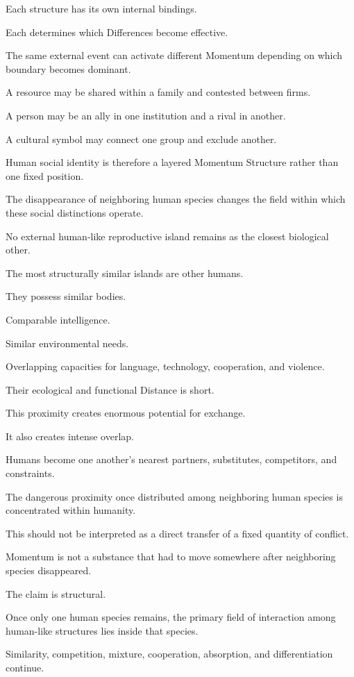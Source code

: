 Each structure has its own internal bindings.

Each determines which Differences become effective.

The same external event can activate different Momentum depending on which boundary becomes dominant.

A resource may be shared within a family and contested between firms.

A person may be an ally in one institution and a rival in another.

A cultural symbol may connect one group and exclude another.

Human social identity is therefore a layered Momentum Structure rather than one fixed position.

The disappearance of neighboring human species changes the field within which these social distinctions operate.

No external human-like reproductive island remains as the closest biological other.

The most structurally similar islands are other humans.

They possess similar bodies.

Comparable intelligence.

Similar environmental needs.

Overlapping capacities for language, technology, cooperation, and violence.

Their ecological and functional Distance is short.

This proximity creates enormous potential for exchange.

It also creates intense overlap.

Humans become one another’s nearest partners, substitutes, competitors, and constraints.

The dangerous proximity once distributed among neighboring human species is concentrated within humanity.

This should not be interpreted as a direct transfer of a fixed quantity of conflict.

Momentum is not a substance that had to move somewhere after neighboring species disappeared.

The claim is structural.

Once only one human species remains, the primary field of interaction among human-like structures lies inside that species.

Similarity, competition, mixture, cooperation, absorption, and differentiation continue.

